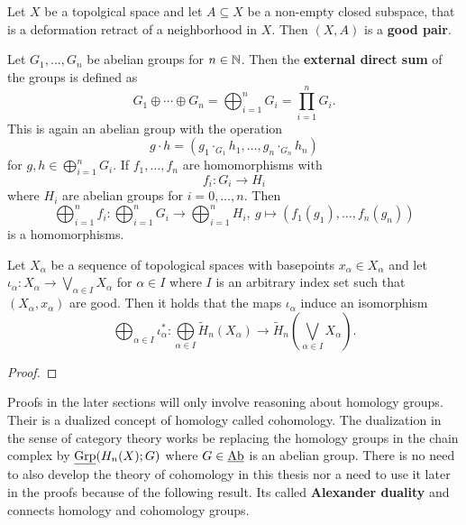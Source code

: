 \begin{defin}
  Let $X$ be a topolgical space and let $A \subseteq X$ be a non-empty closed subspace, that is a deformation retract of a neighborhood in $X$. Then $(X, A)$ is a \textbf{good pair}.
\end{defin}

\begin{defin}
  Let $G_1, \ldots, G_n$ be abelian groups for $n \in \mathbb{N}$. Then the \textbf{external direct sum} of the groups is defined as
  \begin{equation*}
    G_1 \oplus \cdots \oplus G_n = \bigoplus_{i=1}^n G_i = \prod_{i=1}^n G_i.
  \end{equation*}
  This is again an abelian group with the operation \[g \cdot h = (g_1 \cdot_{G_1} h_1, \ldots, g_n \cdot_{G_n} h_n)\] for $g,h \in \bigoplus_{i=1}^n G_i$.
  If $f_1, \ldots, f_n$ are homomorphisms with \[f_i\colon G_i \to H_i\] where $H_i$ are abelian groups for $i = 0,\ldots,n$. Then
  \begin{equation*}
    \bigoplus_{i=1}^nf_i\colon \bigoplus_{i=1}^n G_i\to \bigoplus_{i=1}^nH_i,\: g \mapsto (f_1(g_1),\ldots, f_n(g_n))
  \end{equation*}
  is a homomorphisms.
\end{defin}

\begin{lemma}\label{lem:holwe}
  Let $X_\alpha$ be a sequence of topological spaces with basepoints $x_\alpha\in X_\alpha$ and let $\iota_\alpha\colon X_\alpha \to \bigvee\limits_{\alpha \in I}X_\alpha$ for $\alpha \in I$ where $I$ is an arbitrary index set such that $(X_\alpha, x_\alpha)$ are good. Then it holds that the maps $\iota_\alpha$ induce an isomorphism
  \begin{equation*}
    \bigoplus_{\alpha \in I}\iota_\alpha^* \colon \bigoplus\limits_{\alpha\in I} \tilde{H}_n(X_\alpha)\to \tilde{H}_n\left(\bigvee\limits_{\alpha\in I} X_\alpha\right).
  \end{equation*}
\end{lemma}

\begin{proof}
  
\end{proof}

Proofs in the later sections will only involve reasoning about homology groups. Their is a dualized concept of homology called cohomology.
The dualization in the sense of category theory works be replacing the homology groups in the chain complex by $\underline{\rm Grp}(H_n(X); G)$ where $G \in \underline{\rm Ab}$ is an abelian group. There is no need to also develop the theory of cohomology in this thesis nor a need to use it later in the proofs because of the following result. Its called \textbf{Alexander duality} and connects homology and cohomology groups.

